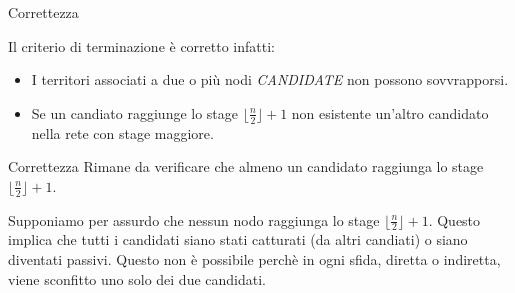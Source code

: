 \begin{frame}{Correttezza}

Il criterio di terminazione è corretto infatti:

\begin{itemize}
\setlength\itemsep{2em}
 \item I territori associati a due o più nodi \textit{CANDIDATE} non possono sovvrapporsi.
 \item Se un candiato raggiunge lo stage $\lfloor\frac{n}{2}\rfloor+1$ non esistente un'altro candidato nella rete con stage maggiore.
\end{itemize}

\end{frame}

\begin{frame}{Correttezza}
 Rimane da verificare che almeno un candidato raggiunga lo stage $\lfloor\frac{n}{2}\rfloor+1$. 

 Supponiamo per assurdo che nessun nodo raggiunga lo stage $\lfloor\frac{n}{2}\rfloor+1$.  Questo implica che tutti i candidati siano stati catturati (da altri candiati) o siano diventati passivi.
 Questo non è possibile perchè in ogni sfida, diretta o indiretta, viene sconfitto uno solo dei due candidati.
 
 
  
\end{frame}

